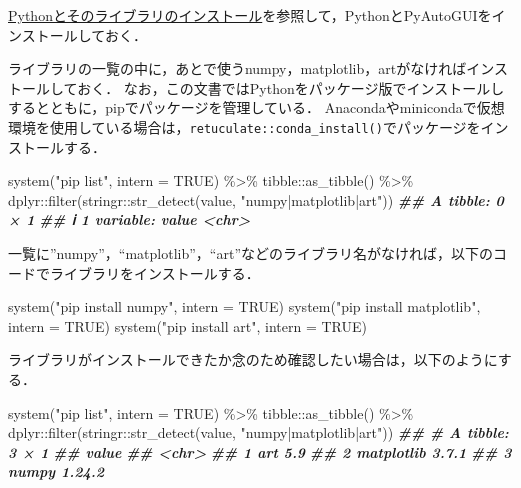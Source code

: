 \documentclass[
]{article}
\newenvironment{Shaded}{\begin{snugshade}}{\end{snugshade}}
\newcommand{\AttributeTok}[1]{\textcolor[rgb]{0.77,0.63,0.00}{#1}}
\newcommand{\ConstantTok}[1]{\textcolor[rgb]{0.00,0.00,0.00}{#1}}
\newcommand{\DocumentationTok}[1]{\textcolor[rgb]{0.56,0.35,0.01}{\textbf{\textit{#1}}}}
\newcommand{\FunctionTok}[1]{\textcolor[rgb]{0.00,0.00,0.00}{#1}}
\newcommand{\NormalTok}[1]{#1}
\newcommand{\SpecialCharTok}[1]{\textcolor[rgb]{0.00,0.00,0.00}{#1}}
\newcommand{\StringTok}[1]{\textcolor[rgb]{0.31,0.60,0.02}{#1}}
\begin{document}
\protect\hyperlink{install_python}{Pythonとそのライブラリのインストール}を参照して，PythonとPyAutoGUIをインストールしておく．

ライブラリの一覧の中に，あとで使うnumpy，matplotlib，artがなければインストールしておく．
なお，この文書ではPythonをパッケージ版でインストールしするとともに，pipでパッケージを管理している．
Anacondaやminicondaで仮想環境を使用している場合は，\texttt{retuculate::conda\_install()}でパッケージをインストールする．

\begin{Shaded}
\begin{Highlighting}[]
\FunctionTok{system}\NormalTok{(}\StringTok{"pip list"}\NormalTok{, }\AttributeTok{intern =} \ConstantTok{TRUE}\NormalTok{) }\SpecialCharTok{\%\textgreater{}\%}
\NormalTok{  tibble}\SpecialCharTok{::}\FunctionTok{as\_tibble}\NormalTok{() }\SpecialCharTok{\%\textgreater{}\%}
\NormalTok{  dplyr}\SpecialCharTok{::}\FunctionTok{filter}\NormalTok{(stringr}\SpecialCharTok{::}\FunctionTok{str\_detect}\NormalTok{(value, }\StringTok{"numpy|matplotlib|art"}\NormalTok{))}
\DocumentationTok{\#\# A tibble: 0 × 1}
\DocumentationTok{\#\# ℹ 1 variable: value \textless{}chr\textgreater{}}
\end{Highlighting}
\end{Shaded}

一覧に''numpy''，``matplotlib''，``art''などのライブラリ名がなければ，以下のコードでライブラリをインストールする．

\begin{Shaded}
\begin{Highlighting}[]
\FunctionTok{system}\NormalTok{(}\StringTok{"pip install numpy"}\NormalTok{, }\AttributeTok{intern =} \ConstantTok{TRUE}\NormalTok{)}
\FunctionTok{system}\NormalTok{(}\StringTok{"pip install matplotlib"}\NormalTok{, }\AttributeTok{intern =} \ConstantTok{TRUE}\NormalTok{)}
\FunctionTok{system}\NormalTok{(}\StringTok{"pip install art"}\NormalTok{, }\AttributeTok{intern =} \ConstantTok{TRUE}\NormalTok{)}
\end{Highlighting}
\end{Shaded}

ライブラリがインストールできたか念のため確認したい場合は，以下のようにする．

\begin{Shaded}
\begin{Highlighting}[]
\FunctionTok{system}\NormalTok{(}\StringTok{"pip list"}\NormalTok{, }\AttributeTok{intern =} \ConstantTok{TRUE}\NormalTok{) }\SpecialCharTok{\%\textgreater{}\%}
\NormalTok{  tibble}\SpecialCharTok{::}\FunctionTok{as\_tibble}\NormalTok{() }\SpecialCharTok{\%\textgreater{}\%}
\NormalTok{  dplyr}\SpecialCharTok{::}\FunctionTok{filter}\NormalTok{(stringr}\SpecialCharTok{::}\FunctionTok{str\_detect}\NormalTok{(value, }\StringTok{"numpy|matplotlib|art"}\NormalTok{))}
\DocumentationTok{\#\# \# A tibble: 3 × 1}
\DocumentationTok{\#\#   value                 }
\DocumentationTok{\#\#   \textless{}chr\textgreater{}                 }
\DocumentationTok{\#\# 1 art             5.9   }
\DocumentationTok{\#\# 2 matplotlib      3.7.1 }
\DocumentationTok{\#\# 3 numpy           1.24.2}
\end{Highlighting}
\end{Shaded}
\end{document}
